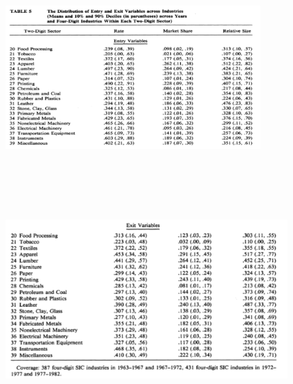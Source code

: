 \documentclass[dvipdfmx,12pt]{beamer}
\begin{document}
\begin{frame}

\begin{center}

\includegraphics[width=9.5cm,height=7.75cm]{DRS_T5a.pdf}

\end{center}

\end{frame}

\begin{frame}

\begin{center}

\includegraphics[width=10.5cm,height=7.75cm]{DRS_T5b.pdf}

\end{center}

\end{frame}
\end{document}
